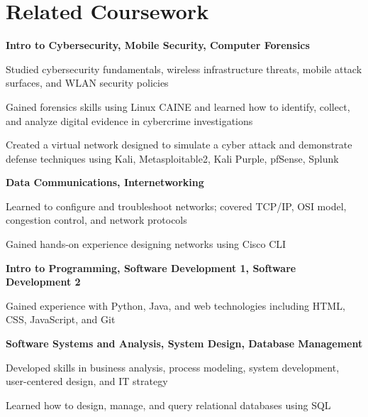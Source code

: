 \documentclass[letterpaper,10pt]{article}
\newcommand{\heading}[2]{
  \hspace{10pt}#1\hfill#2\\
}
\newcommand{\headingBf}[2]{
  \heading{\textbf{#1}}{\textbf{#2}}
}
\newenvironment{resume_list}{
  \vspace{-7pt}
  \begin{itemize}[itemsep=-2px, parsep=1pt, leftmargin=30pt]
}{
  \end{itemize}
}
\begin{document}
\section{Related Coursework}

\headingBf{Intro to Cybersecurity, Mobile Security, Computer Forensics}{}
\begin{resume_list}
  \item Studied cybersecurity fundamentals, wireless infrastructure threats, mobile attack surfaces, and WLAN security policies
  \item Gained forensics skills using Linux CAINE and learned how to identify, collect, and analyze digital evidence in cybercrime investigations
    \item Created a virtual network designed to simulate a cyber attack and demonstrate defense techniques using Kali, Metasploitable2, Kali Purple, pfSense, Splunk
\end{resume_list}


\headingBf{Data Communications, Internetworking}{}
\begin{resume_list}
  \item Learned to configure and troubleshoot networks; covered TCP/IP, OSI model, congestion control, and network protocols
  \item Gained hands-on experience designing networks using Cisco CLI
\end{resume_list}

\headingBf{Intro to Programming, Software Development 1, Software Development 2}{}
\begin{resume_list}
  \item Gained experience with Python, Java, and web technologies including HTML, CSS, JavaScript, and Git
\end{resume_list}

\headingBf{Software Systems and Analysis, System Design, Database Management}{}
\begin{resume_list}
  \item Developed skills in business analysis, process modeling, system development, user-centered design, and IT strategy
  \item Learned how to design, manage, and query relational databases using SQL
\end{resume_list}
\end{document}
